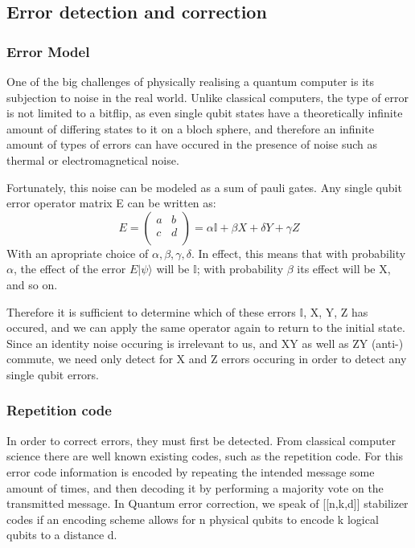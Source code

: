 \subsection{Error detection and correction}
\subsubsection{Error Model}
One of the big challenges of physically realising a quantum 
computer is its subjection to noise in the real world.
Unlike classical computers, the type of error is not limited
to a bitflip, as even single qubit states have a theoretically
infinite amount of differing states to it on a bloch sphere,
and therefore an infinite amount of types of errors can have
occured in the presence of noise such as thermal or electromagnetical
noise.

Fortunately, this noise can be modeled as a sum of pauli gates.
Any single qubit error operator matrix E can be written as:
\begin{equation}
    E =
    \left(
    \begin{array}{cc}
        a & b \\
        c & d \\
    \end{array}
    \right) = 
    \alpha \mathbb{I} + \beta X + \delta Y + \gamma Z
\end{equation}
With an apropriate choice of $\alpha, \beta, \gamma, \delta$.
In effect, this means that with probability $\alpha$, the effect of the
error $E|\psi\rangle$ will be $\mathbb{I}$; with probability $\beta$ its effect
will be X, and so on.

Therefore it is sufficient to determine which of these errors $\mathbb{I}$, 
X, Y, Z has occured, and we can apply the same operator again to return to the 
initial state.
Since an identity noise occuring is irrelevant to us, and XY as
well as ZY (anti-) commute, we need only detect for X and Z
errors occuring in order to detect any single qubit errors. 


\subsubsection{Repetition code}
In order to correct errors, they must first be detected.
From classical computer science there are well known existing
codes, such as the repetition code.
For this error code information is encoded by repeating the 
intended message some amount of times, and then decoding it
by performing a majority vote on the transmitted message.
In Quantum error correction, we speak of [[n,k,d]] stabilizer
codes if an encoding scheme allows for n physical qubits to 
encode k logical qubits to a distance d.

